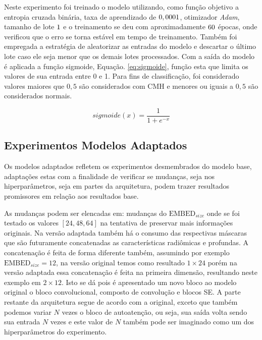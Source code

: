 Neste experimento foi treinado o modelo utilizando, como função objetivo a entropia cruzada binária, taxa de aprendizado de $0,0001$, otimizador \textit{Adam}, tamanho de lote $1$ e o treinamento se deu com aproximadamente $60$ épocas, onde verificou que o erro se torna estável em tempo de treinamento. Também foi empregada a estratégia de aleatorizar as entradas do modelo e descartar o último lote caso ele seja menor que os demais lotes processados. Com a saída do modelo é aplicada a função sigmoide, Equação. \ref{eq:sigmoide}, função esta que limita os valores de sua entrada entre 0 e 1. Para fins de classificação, foi considerado valores maiores que $0,5$ são considerados com \gls{CMH} e menores ou iguais a $0,5$ são considerados normais.

\begin{equation}
\textit{sigmoide}(x) = \frac{1}{1 + e^{-x}}
\label{eq:sigmoide}
\end{equation}

\subsection{Experimentos Modelos Adaptados}
\label{subsec:cap5_experimentos_adaptados}

Os modelos adaptados refletem os experimentos desmembrados do modelo base, adaptações estas com a finalidade de verificar se mudanças, seja nos hiperparâmetros, seja em partes da arquitetura, podem trazer resultados promissores em relação aos resultados base.

As mudanças podem ser elencadas em: mudanças do $\text{EMBED}_{size}$ onde se foi testado os valores $[24, 48, 64]$ na tentativa de preservar mais informações originais. Na versão adaptada também há o consumo das respectivas máscaras que são futuramente concatenadas as características radiômicas e profundas. A concatenação é feita de forma diferente também, assumindo por exemplo $\text{EMBED}_{size} = 12$, na versão original temos como resultado $1\times24$ porém na versão adaptada essa concatenação é feita na primeira dimensão, resultando neste exemplo em $2\times12$. Isto se dá pois é apresentado um novo bloco ao modelo original o bloco convolucional, composto de convolução e blocos \gls{SE}. A parte restante da arquitetura segue de acordo com a original, exceto que também podemos variar $N$ vezes o bloco de autoatenção, ou seja, sua saída volta sendo sua entrada $N$ vezes e este valor de $N$ também pode ser imaginado como um dos hiperparâmetros do experimento.

